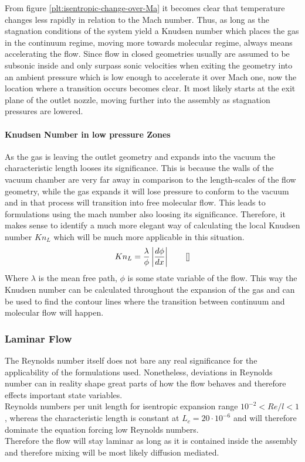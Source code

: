 	

	From figure \ref{plt:isentropic-change-over-Ma} it becomes clear that temperature changes less rapidly in relation to the Mach number.
	Thus, as long as the stagnation conditions of the system yield a Knudsen number which places the gas in the continuum regime, moving more towards molecular regime, always means accelerating the flow.
	Since flow in closed geometries usually are assumed to be subsonic inside and only surpass sonic velocities when exiting the geometry into an ambient pressure which is low enough to accelerate it over Mach one, now the location where a transition occurs becomes clear.
	It most likely starts at the exit plane of the outlet nozzle, moving further into the assembly as stagnation pressures are lowered.
	\paragraph{Knudsen Number in low pressure Zones}
		As the gas is leaving the outlet geometry and expands into the vacuum the characteristic length looses its significance.
		This is because the walls of the vacuum chamber are very far away in comparison to the length-scales of the flow geometry, while the gas expands it will lose pressure to conform to the vacuum and in that process will transition into free molecular flow.
		This leads to formulations using the mach number also loosing its significance.
		Therefore, it makes sense to identify a much more elegant way of calculating the local Knudsen number $Kn_L$ which will be much more applicable in this situation.
		$$
			K n_L = \frac{\lambda}{\phi} \left| \frac{d\phi}{dx} \right| \qquad \eqref{}
		$$
		Where $\lambda$ is the mean free path, $\phi$ is some state variable of the flow.
		This way the Knudsen number can be calculated throughout the expansion of the gas and can be used to find the contour lines where the transition between continuum and molecular flow will happen. 
		\cite{bird_dsmc_2013, Grabe2008, LiLam1964}

\subsubsection*{Laminar Flow}
	The Reynolds number itself does not bare any real significance for the applicability of the formulations used. Nonetheless, deviations in Reynolds number can in reality shape great parts of how the flow behaves and therefore effects important state variables.\\
	Reynolds numbers per unit length for isentropic expansion range $10^{-2} < Re/l < 1$, whereas the characteristic length is constant at $L_c = 20\cdot 10^{-6}$ and will therefore dominate the equation forcing low Reynolds numbers. \cite{ames1953compressible}\\
	Therefore the flow will stay laminar as long as it is contained inside the assembly and therefore mixing will be most likely diffusion mediated.
	\cite{comsol_microfluidics_guide}
	
